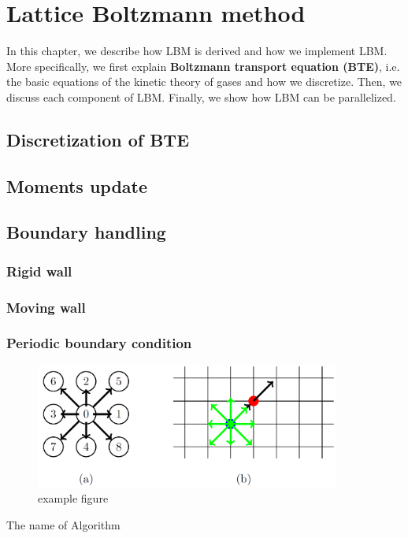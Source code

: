 \chapter{Lattice Boltzmann method}
\vspace{-5mm}
In this chapter, we describe how LBM is derived
and how we implement LBM.
More specifically, we first explain
{\bf Boltzmann transport equation (BTE)}, i.e.
the basic equations of the kinetic theory of gases and
how we discretize.
Then, we discuss each component of LBM.
Finally, we show how LBM can be parallelized.

\section{Discretization of BTE}

\section{Moments update}

\section{Boundary handling}
\subsection{Rigid wall}

\subsection{Moving wall}

\subsection{Periodic boundary condition}


\begin{figure}[h!]
  \begin{center}
   \includegraphics[width=10cm]{logos/Gitter_LBM.png}
   \caption{example figure}
  \label{fig:mesh}
  \end{center}
\end{figure}

\begin{algorithm}[tb]
  \caption{The name of Algorithm}
  \label{alg:label}
  \begin{algorithmic}[1]
     
     
    \EndIf
    \EndFor
    \EndFunction
  \end{algorithmic}
\end{algorithm}